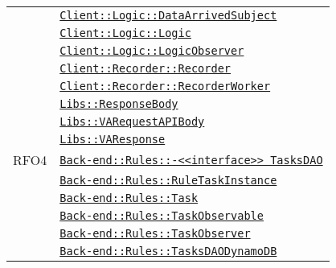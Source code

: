 \begin{longtable}{|>{\centering}m{3cm}|m{10cm}<{\centering}|}
& \hyperref[Client::Logic::DataArrivedSubject]{\texttt{Client::Logic::DataArrivedSubject}}\\
& \hyperref[Client::Logic::Logic]{\texttt{Client::Logic::Logic}}\\
& \hyperref[Client::Logic::LogicObserver]{\texttt{Client::Logic::LogicObserver}}\\
& \hyperref[Client::Recorder::Recorder]{\texttt{Client::Recorder::Recorder}}\\
& \hyperref[Client::Recorder::RecorderWorker]{\texttt{Client::Recorder::RecorderWorker}}\\
& \hyperref[Libs::ResponseBody]{\texttt{Libs::ResponseBody}}\\
& \hyperref[Libs::VARequestAPIBody]{\texttt{Libs::VARequestAPIBody}}\\
& \hyperref[Libs::VAResponse]{\texttt{Libs::VAResponse}}\\ \hline

RFO4 & \hyperref[Back-end::Rules::<<interface>> TasksDAO]{\texttt{Back-end::Rules::-\linebreak <<interface>> TasksDAO}}\\
& \hyperref[Back-end::Rules::RuleTaskInstance]{\texttt{Back-end::Rules::RuleTaskInstance}}\\
& \hyperref[Back-end::Rules::Task]{\texttt{Back-end::Rules::Task}}\\
& \hyperref[Back-end::Rules::TaskObservable]{\texttt{Back-end::Rules::TaskObservable}}\\
& \hyperref[Back-end::Rules::TaskObserver]{\texttt{Back-end::Rules::TaskObserver}}\\
& \hyperref[Back-end::Rules::TasksDAODynamoDB]{\texttt{Back-end::Rules::TasksDAODynamoDB}}\\ \hline


\end{longtable}
